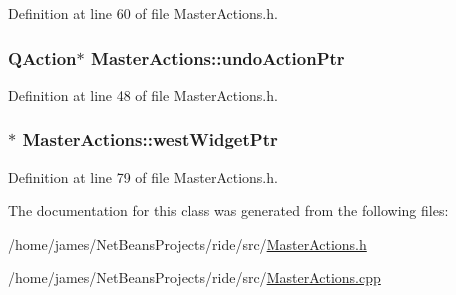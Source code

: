 Definition at line 60 of file Master\-Actions.\-h.

\hypertarget{class_master_actions_a23386959a2f60a89cc6ae1bff012c76c}{
\subsubsection[{undo\-Action\-Ptr}]{\setlength{\rightskip}{0pt plus 5cm}Q\-Action$\ast$ Master\-Actions\-::undo\-Action\-Ptr\hspace{0.3cm}{\ttfamily [private]}}}\label{class_master_actions_a23386959a2f60a89cc6ae1bff012c76c}


Definition at line 48 of file Master\-Actions.\-h.

\hypertarget{class_master_actions_a84f8a14213e1f05a00f1855b41a973de}{
\subsubsection[{west\-Widget\-Ptr}]{$\ast$ Master\-Actions\-::west\-Widget\-Ptr\hspace{0.3cm}{\ttfamily [private]}}}\label{class_master_actions_a84f8a14213e1f05a00f1855b41a973de}


Definition at line 79 of file Master\-Actions.\-h.



The documentation for this class was generated from the following files\-:\begin{DoxyCompactItemize}
\item 
/home/james/\-Net\-Beans\-Projects/ride/src/\hyperlink{_master_actions_8h}{Master\-Actions.\-h}\item 
/home/james/\-Net\-Beans\-Projects/ride/src/\hyperlink{_master_actions_8cpp}{Master\-Actions.\-cpp}\end{DoxyCompactItemize}
